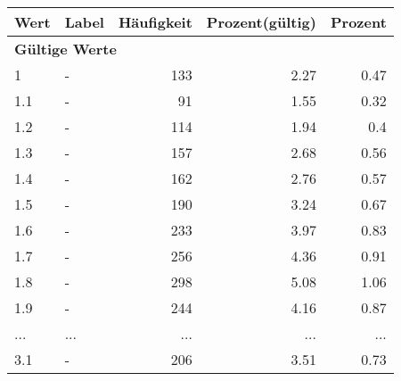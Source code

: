      \begin{longtable}{lXrrr}
     \toprule
     \textbf{Wert} & \textbf{Label} & \textbf{Häufigkeit} & \textbf{Prozent(gültig)} & \textbf{Prozent} \\
     \endhead
     \midrule
     \multicolumn{5}{l}{\textbf{Gültige Werte}}\\
        1 & \multicolumn{1}{X}{-} & %
          \num{133} &
          \num[round-mode=places,round-precision=2]{2,27} &
          \num[round-mode=places,round-precision=2]{0,47} \\
        1.1 & \multicolumn{1}{X}{-} & %
          \num{91} &
          \num[round-mode=places,round-precision=2]{1,55} &
          \num[round-mode=places,round-precision=2]{0,32} \\
        1.2 & \multicolumn{1}{X}{-} & %
          \num{114} &
          \num[round-mode=places,round-precision=2]{1,94} &
          \num[round-mode=places,round-precision=2]{0,4} \\
        1.3 & \multicolumn{1}{X}{-} & %
          \num{157} &
          \num[round-mode=places,round-precision=2]{2,68} &
          \num[round-mode=places,round-precision=2]{0,56} \\
        1.4 & \multicolumn{1}{X}{-} & %
          \num{162} &
          \num[round-mode=places,round-precision=2]{2,76} &
          \num[round-mode=places,round-precision=2]{0,57} \\
        1.5 & \multicolumn{1}{X}{-} & %
          \num{190} &
          \num[round-mode=places,round-precision=2]{3,24} &
          \num[round-mode=places,round-precision=2]{0,67} \\
        1.6 & \multicolumn{1}{X}{-} & %
          \num{233} &
          \num[round-mode=places,round-precision=2]{3,97} &
          \num[round-mode=places,round-precision=2]{0,83} \\
        1.7 & \multicolumn{1}{X}{-} & %
          \num{256} &
          \num[round-mode=places,round-precision=2]{4,36} &
          \num[round-mode=places,round-precision=2]{0,91} \\
        1.8 & \multicolumn{1}{X}{-} & %
          \num{298} &
          \num[round-mode=places,round-precision=2]{5,08} &
          \num[round-mode=places,round-precision=2]{1,06} \\
        1.9 & \multicolumn{1}{X}{-} & %
          \num{244} &
          \num[round-mode=places,round-precision=2]{4,16} &
          \num[round-mode=places,round-precision=2]{0,87} \\
       ... & ... & ... & ... & ... \\
        3.1 & \multicolumn{1}{X}{-} & %
          \num{206} &
          \num[round-mode=places,round-precision=2]{3,51} &
          \num[round-mode=places,round-precision=2]{0,73} \\


\end{longtable}

